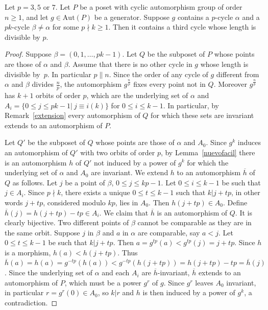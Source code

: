 \documentclass[ALCO,published]{cedram}
\renewcommand{\varphi}{h}
\newcommand{\aut}{\textrm{Aut}}
\begin{document}
\begin{lema} \label{lema357}
Let $p=3,5$ or $7$. Let $P$ be a poset with cyclic automorphism group of order $n\ge 1$, and let $g\in \aut(P)$ be a generator. Suppose $g$ contains a $p$-cycle $\alpha$ and a $pk$-cycle $\beta\neq \alpha$ for some $p\nmid k\ge 1$. Then it contains a third cycle whose length is divisible by $p$.
\end{lema}
\begin{proof}
Suppose $\beta=(0,1,\ldots, pk-1)$. Let $Q$ be the subposet of $P$ whose points are those of $\alpha$ and $\beta$. Assume that there is no other cycle in $g$ whose length is divisible by~$p$. In particular $p\parallel n$. Since the order of any cycle of $g$ different from $\alpha$ and $\beta$ divides $\frac{n}{p}$, the automorphism $g^{\frac{n}{p}}$ fixes every point not in $Q$. Moreover $g^{\frac{n}{p}}$ has $k+1$ orbits of order $p$, which are the underlying set of $\alpha$ and $A_i=\{0\le j\le pk-1 | \ j\equiv i (k)\}$ for $0\le i\le k-1$. In particular, by Remark~\ref{extension} every automorphism of $Q$ for which these sets are invariant extends to an automorphism of $P$.

Let $Q'$ be the subposet of $Q$ whose points are those of $\alpha$ and $A_0$. Since $g^{k}$ induces an automorphism of $Q'$ with two orbits of order $p$, by Lemma~\ref{nuevofacil} there is an automorphism $\varphi$ of $Q'$ not induced by a power of $g^{k}$ for which the underlying set of $\alpha$ and $A_0$ are invariant. We extend $\varphi$ to an automorphism $\overline{\varphi}$ of $Q$ as follows. Let $j$ be a point of $\beta$, $0\le j\le kp-1$. Let $0\le i\le k-1$ be such that $j\in A_i$. Since $p\nmid k$, there exists a unique  $0\le t\le k-1$ such that $k|j+tp$, in other words $j+tp$, considered modulo $kp$, lies in $A_0$. Then $\varphi(j+tp)\in A_0$. Define $\overline{\varphi}(j)=\varphi(j+tp)-tp\in A_i$. We claim that $\overline{\varphi}$ is an automorphism of $Q$. It is clearly bijective. Two different points of $\beta$ cannot be comparable as they are in the same orbit. Suppose $j$ in $\beta$ and $a$ in $\alpha$ are comparable, say $a<j$. Let $0\le t\le k-1$ be such that $k|j+tp$. Then $a=g^{tp}(a)<g^{tp}(j)=j+tp$. Since $\varphi$ is a morphism, $\varphi(a)<\varphi(j+tp)$. Thus $\overline{\varphi}(a)=\varphi (a)=g^{-tp}(\varphi(a))<g^{-tp} (\varphi(j+tp))=\varphi(j+tp)-tp=\overline{\varphi}(j)$. Since the underlying set of $\alpha$ and each $A_i$ are $\overline{\varphi}$-invariant, $\overline{\varphi}$ extends to an automorphism of $P$, which must be a power $g^r$ of $g$. Since $g^r$ leaves $A_0$ invariant, in particular $r=g^r(0)\in A_0$, so $k|r$ and $\varphi$ is then induced by a power of $g^k$, a contradiction.   
\end{proof}
\end{document}
